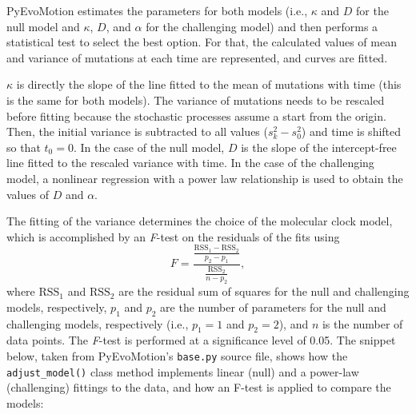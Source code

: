 PyEvoMotion estimates the parameters for both models (i.e., $\kappa$ and $D$ for the null model and $\kappa$, $D$, and $\alpha$ for the challenging model) and then performs a statistical test to select the best option. For that, the calculated values of mean and variance of mutations at each time are represented, and curves are fitted.

$\kappa$ is directly the slope of the line fitted to the mean of mutations with time (this is the same for both models). The variance of mutations needs to be rescaled before fitting because the stochastic processes assume a start from the origin. Then, the initial variance is subtracted to all values ($s_k^2 - s_0^2$) and time is shifted so that $t_0=0$. In the case of the null model, $D$ is the slope of the intercept-free line fitted to the rescaled variance with time. In the case of the challenging model, a nonlinear regression with a power law relationship is used to obtain the values of $D$ and $\alpha$.

The fitting of the variance determines the choice of the molecular clock model, which is accomplished by an \textit{F}-test on the residuals of the fits using
%
\begin{equation}
    F = \frac{\frac{\text{RSS}_1-\text{RSS}_2}{p_2-p_1}}{\frac{\text{RSS}_2}{n-p_2}},
\end{equation}
%
where $\text{RSS}_1$ and $\text{RSS}_2$ are the residual sum of squares for the null and challenging models, respectively, $p_1$ and $p_2$ are the number of parameters for the null and challenging models, respectively (i.e., $p_1=1$ and $p_2=2$), and $n$ is the number of data points. The \textit{F}-test is performed at a significance level of 0.05. The snippet below, taken from PyEvoMotion's \texttt{base.py} source file, shows how the \texttt{adjust\_model()} class method implements linear (null) and a power-law (challenging) fittings to the data, and how an F-test is applied to compare the models:

